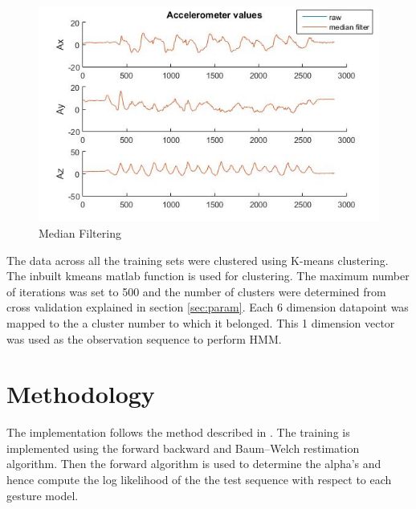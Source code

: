 \documentclass[fleqn,10pt]{SelfArx} %
\begin{document}
\begin{figure}[hbtp]
\centering
\includegraphics[scale=0.45]{med.jpg}
\caption{Median Filtering}
\label{fig:med}
\end{figure}

The data across all the training sets were clustered using K-means clustering. The inbuilt kmeans matlab function is used for clustering. The maximum number of iterations was set to 500 and the number of clusters were determined from cross validation explained in section \ref{sec:param}. Each 6 dimension datapoint was mapped to the a cluster number to which it belonged. This 1 dimension vector was used as the observation sequence to perform HMM.

\section{Methodology}
\label{sec:hmm}
The implementation follows the method described in \cite{}. The training is implemented using the forward backward and Baum–Welch restimation algorithm. Then the forward algorithm is used to determine the alpha's and hence compute the log likelihood of the the test sequence with respect to each gesture model. 
\end{document}
